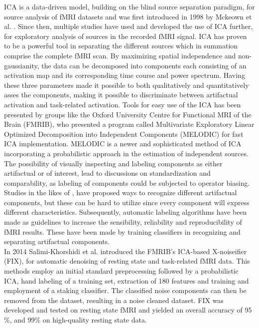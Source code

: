ICA is a data-driven model, building on the blind source separation paradigm, for source analysis of fMRI datasets and was first introduced in 1998 by Mckeown et al. \cite{Mckeown1998}. Since then, multiple studies \cite{Calhoun2001a,Deslauriers2017,Parkes2018,Du2018,Tohka2008} have used and developed the use of ICA further, for exploratory analysis of sources in the recorded fMRI signal. ICA has proven to be a powerful tool in separating the different sources which in summation comprise the complete fMRI scan. By maximizing spatial independence and non-gaussianity, the data can be decomposed into components each consisting of an activation map and its corresponding time course and power spectrum. \cite{Salimi-Khorshidi2014} Having these three parameters made it possible to both qualitatively and quantitatively asses the components, making it possible to discriminate between artifactual activation and task-related activation. Tools for easy use of the ICA has been presented by groups like the Oxford University Centre for Functional MRI of the Brain (FMRIB), who presented a program called Multivariate Exploratory Linear Optimized Decomposition into Independent Components (MELODIC) for fast ICA implementation. MELODIC is a newer and sophisticated method of ICA incorporating a probabilistic approach in the estimation of independent sources. \cite{FMRIB2016} The possibility of visually inspecting and labeling components as either artifactual or of interest, lead to discussions on standardization and comparability, as labeling of components could be subjected to operator biasing. Studies in the likes of \cite{Salimi-Khorshidi2014,Griffanti2017}, have proposed ways to recognize different artifactual components, but these can be hard to utilize since every component will express different characteristics. Subsequently, automatic labeling algorithms have been made as guidelines to increase the sensibility, reliability and reproducibility of fMRI results. These have been made by training classifiers in recognizing and separating artifactual components. \cite{Tohka2008} \\
In 2014 Salimi-Khorshidi et al. \cite{Salimi-Khorshidi2014} introduced the FMRIB's ICA-based X-noiseifier (FIX), for automatic denoising of resting state and task-related fMRI data. This methods employ an initial standard preprocessing followed by a probabilistic ICA, hand labeling of a training set, extraction of 180 features and training and employment of a staking classifier. The classified noise components can then be removed from the dataset, resulting in a noise cleaned dataset. FIX was developed and tested on resting state fMRI and yielded an overall accuracy of 95$\percent$, and 99$\percent$ on high-quality resting state data. \cite{Salimi-Khorshidi2014}   \\
